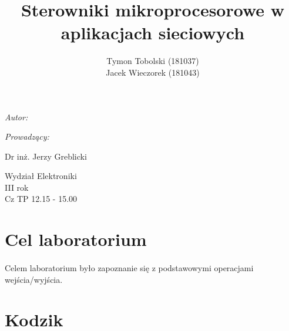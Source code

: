 \documentclass[wide,a4paper,titlepage,12pt] {article}
\title{Sterowniki mikroprocesorowe w aplikacjach sieciowych}
\author{Tymon Tobolski (181037)\\ Jacek Wieczorek (181043)}
\makeatletter
\renewcommand{\maketitle}{
\begin{titlepage}
  \begin{center}
    \vspace*{3cm}
    \LARGE \@title \par
    \vspace{2cm}
    \textit{\small Autor:}\par
    \normalsize \@author\par \normalsize
    \vspace{3cm}
    \textit{\small Prowadzący:}\par
    Dr inż. Jerzy Greblicki \par
    \vspace{2cm}
    Wydział Elektroniki\\ III rok\\ Cz TP 12.15 - 15.00\par

  \end{center}
\end{titlepage}
}
\makeatother
\begin{document}
\maketitle
  \section{Cel laboratorium}
  \paragraph{}
  Celem laboratorium było zapoznanie się z podstawowymi operacjami wejścia/wyjścia.

  \section{Kodzik}
  
\end{document}
